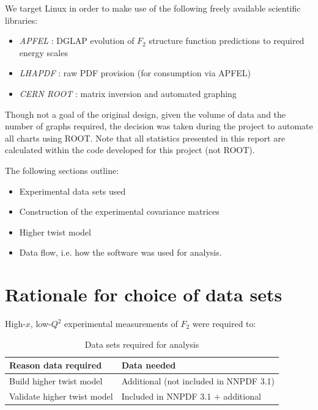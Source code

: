 \documentclass[12pt,a4paper]{report}
\begin{document}
We target Linux in order to make use of the following freely available scientific libraries:
\begin{itemize}
\item \emph{APFEL} \cite{APFEL}: DGLAP evolution of $F_2$ structure function predictions to required energy scales
\item \emph{LHAPDF} \cite{LHAPDF}: raw PDF provision (for consumption via APFEL)
\item \emph{CERN ROOT} \cite{ROOT}: matrix inversion and automated graphing
\end{itemize}
Though not a goal of the original design, given the volume of data and the number of graphs required, the decision was taken during the project to automate all charts using ROOT. Note that all statistics presented in this report are calculated within the code developed for this project (not ROOT).

The following sections outline:
\begin{itemize}
\item Experimental data sets used
\item Construction of the experimental covariance matrices
\item Higher twist model
\item Data flow, i.e. how the software was used for analysis.
\end{itemize}

\section{Rationale for choice of data sets}

High-$x$, low-$Q^2$ experimental measurements of $F_2$ were required to:
\begin{table}[H]
\begin{center}
\begin{tabular}{|l|l|}
\hline
\textbf{Reason data required} & \textbf{Data needed}\\
\hline
Build higher twist model & Additional (not included in NNPDF 3.1)\\
\hline
Validate higher twist model & Included in NNPDF 3.1 $+$ additional\\
\hline
\end{tabular}
\caption{Data sets required for analysis}
\label{tb:design_datasets_required}
\end{center}
\end{table}
\end{document}
